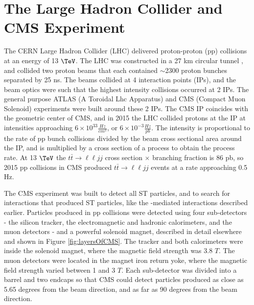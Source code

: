 \chapter{The Large Hadron Collider and CMS Experiment}
\label{sec:experiment_chapter}
The CERN Large Hadron Collider (LHC) delivered proton-proton (pp) collisions at an energy of 13 $\TeV$.  The LHC 
was constructed in a 27 km circular tunnel \cite{lhcTDR}, and collided two proton beams that each contained 
$\sim$2300 proton bunches separated by 25 ns.  The beams collided at 4 interaction points (IPs), and the beam optics 
were such that the highest intensity collisions occurred at 2 IPs.  The general purpose ATLAS 
(A Toroidal Lhc Apparatus) \cite{atlasTdrPhysPerformance} and CMS (Compact Muon Solenoid) \cite{cmsTdrPhysPerformance} 
experiments were built around these 2 IPs.  The CMS IP coincides with the geometric center of CMS, and in 2015 
the LHC collided protons at the IP at intensities approaching $6 \times 10^{33} \frac{Hz}{cm^{2}}$, or $6 \times 10^{-3} \frac{Hz}{pb}$.  
The intensity is proportional to the rate of pp bunch collisions divided by the beam cross 
sectional area around the IP, and is multiplied by a cross section of a process to obtain the process rate.  
At 13 $\TeV$ the $t\bar{t} \rightarrow \ell\ell jj$ cross section $\times$ branching fraction is 86 pb, so 
2015 pp collisions in CMS produced $t\bar{t} \rightarrow \ell\ell jj$ events at a rate approaching 0.5 Hz.

The CMS experiment was built to detect all ST particles, and to search for interactions that produced ST particles, 
like the \WR-mediated interactions described earlier.  Particles produced in pp collisions were detected using four 
sub-detectors - the silicon tracker, the electromagnetic and hadronic calorimeters, and the muon detectors - and a powerful 
solenoid magnet, described in detail elsewhere \cite{cmsDetectorPaper} and shown in Figure \ref{fig:layersOfCMS}.  
The tracker and both calorimeters were inside the solenoid magnet, where the magnetic field strength was 3.8 $\unit{T}$.  
The muon detectors were located in the magnet iron return yoke, where the magnetic field strength varied between 
1 and 3 $\unit{T}$.  Each sub-detector was divided into a barrel 
and two endcaps so that CMS could detect particles produced as close as 5.65 degrees from the beam direction, and 
as far as 90 degrees from the beam direction.  

